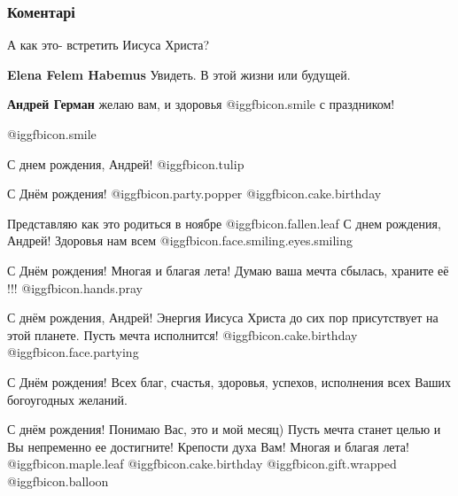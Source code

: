  
 
 
 
 
\subsubsection{Коментарі}
\label{sec:03_11_2021.fb.german_andrej.kiev.1.mechta.cmt}

\begin{itemize} %
А как это- встретить Иисуса Христа?

\begin{itemize} %
\textbf{Elena Felem Habemus} Увидеть. В этой жизни или будущей.

\textbf{Андрей Герман} желаю вам, и здоровья  @igg{fbicon.smile}  с праздником!
\end{itemize} %

 @igg{fbicon.smile} 

С днем рождения, Андрей!  @igg{fbicon.tulip} 

С Днём рождения!  @igg{fbicon.party.popper}  @igg{fbicon.cake.birthday} 

Представляю как это родиться в ноябре  @igg{fbicon.fallen.leaf} 
С днем рождения, Андрей! Здоровья нам всем  @igg{fbicon.face.smiling.eyes.smiling} 

С Днём рождения! Многая и благая лета! Думаю ваша мечта сбылась, храните её !!! @igg{fbicon.hands.pray} 

С днём рождения, Андрей! Энергия Иисуса Христа до сих пор присутствует на этой планете. Пусть мечта исполнится!  @igg{fbicon.cake.birthday}  @igg{fbicon.face.partying} 

С Днём рождения! Всех благ, счастья, здоровья, успехов, исполнения всех Ваших богоугодных желаний.

С днём рождения!
Понимаю Вас, это и мой месяц)
Пусть мечта станет целью и Вы непременно ее достигните! Крепости духа Вам! Многая и благая лета!  @igg{fbicon.maple.leaf}  @igg{fbicon.cake.birthday}  @igg{fbicon.gift.wrapped}  @igg{fbicon.balloon} 


\end{itemize}
